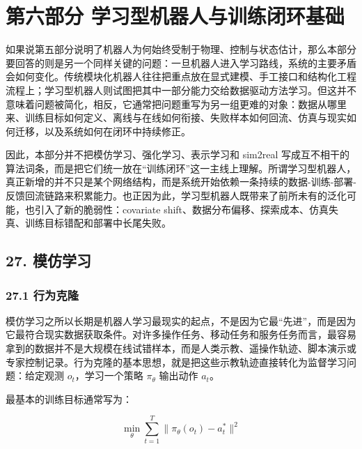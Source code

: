 
\part*{第六部分 学习型机器人与训练闭环基础}

如果说第五部分说明了机器人为何始终受制于物理、控制与状态估计，那么本部分要回答的则是另一个同样关键的问题：一旦机器人进入学习路线，系统的主要矛盾会如何变化。传统模块化机器人往往把重点放在显式建模、手工接口和结构化工程流程上；学习型机器人则试图把其中一部分能力交给数据驱动方法学习。但这并不意味着问题被简化，相反，它通常把问题重写为另一组更难的对象：数据从哪里来、训练目标如何定义、离线与在线如何衔接、失败样本如何回流、仿真与现实如何迁移，以及系统如何在闭环中持续修正。

因此，本部分并不把模仿学习、强化学习、表示学习和 sim2real 写成互不相干的算法词条，而是把它们统一放在“训练闭环”这一主线上理解。所谓学习型机器人，真正新增的并不只是某个网络结构，而是系统开始依赖一条持续的数据-训练-部署-反馈回流链路来积累能力。也正因为此，学习型机器人既带来了前所未有的泛化可能，也引入了新的脆弱性：covariate shift、数据分布偏移、探索成本、仿真失真、训练目标错配和部署中长尾失败。

\chapter*{27. 模仿学习}

\section*{27.1 行为克隆}


模仿学习之所以长期是机器人学习最现实的起点，不是因为它最“先进”，而是因为它最符合现实数据获取条件。对许多操作任务、移动任务和服务任务而言，最容易拿到的数据并不是大规模在线试错样本，而是人类示教、遥操作轨迹、脚本演示或专家控制记录。行为克隆的基本思想，就是把这些示教轨迹直接转化为监督学习问题：给定观测 \(o_t\)，学习一个策略 \(\pi_\theta\) 输出动作 \(a_t\)。

最基本的训练目标通常写为：

\begingroup
\footnotesize
\begin{equation*}
\min_{\theta} \sum_{t=1}^{T} \lVert \pi_{\theta}(o_t) - a_t^\ast \rVert^2
\end{equation*}
\endgroup

